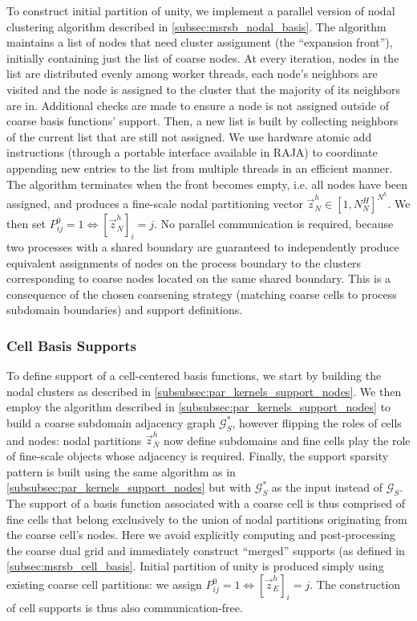 To construct initial partition of unity, we implement a parallel version of nodal clustering algorithm described in \cref{subsec:msrsb_nodal_basis}.   The algorithm maintains a list of nodes that need cluster assignment (the ``expansion front''), initially containing just the list of coarse nodes.   At every iteration, nodes in the list are distributed evenly among worker threads, each node's neighbors are visited and the node is assigned to the cluster that the majority of its neighbors are in.   Additional checks are made to ensure a node is not assigned outside of coarse basis functions' support.   Then, a new list is built by collecting neighbors of the current list that are still not assigned.   We use hardware atomic add instructions (through a portable interface available in RAJA) to coordinate appending new entries to the list from multiple threads in an efficient manner.   The algorithm terminates when the front becomes empty, i.e. all nodes have been assigned, and produces a fine-scale nodal partitioning vector $\vec{z}_N^h \in [1,N_N^H]^{N^h}$.    We then set $P_{ij}^0 = 1 \Leftrightarrow [\vec{z}_N^h]_i = j$.   No parallel communication is required, because two processes with a shared boundary are guaranteed to independently produce equivalent assignments of nodes on the process boundary to the clusters corresponding to coarse nodes located on the same shared boundary.   This is a consequence of the chosen coarsening strategy (matching coarse cells to process subdomain boundaries) and support definitions.

\subsubsection{Cell Basis Supports}
\label{subsubsec:par_kernels_support_cells}

To define support of a cell-centered basis functions, we start by building the nodal clusters as described in \cref{subsubsec:par_kernels_support_nodes}.   We then employ the algorithm described in \cref{subsubsec:par_kernels_support_nodes} to build a coarse subdomain adjacency graph $\mathcal{G}_S^*$, however flipping the roles of cells and nodes: nodal partitions $\vec{z}_N^h$ now define subdomains and fine cells play the role of fine-scale objects whose adjacency is required.   Finally, the support sparsity pattern is built using the same algorithm as in \cref{subsubsec:par_kernels_support_nodes} but with $\mathcal{G}_S^*$ as the input instead of $\mathcal{G}_S$.   The support of a basis function associated with a coarse cell is thus comprised of fine cells that belong exclusively to the union of nodal partitions originating from the coarse cell's nodes.   Here we avoid explicitly computing and post-processing the coarse dual grid and immediately construct ``merged'' supports (as defined in \cref{subsec:msrsb_cell_basis}.   Initial partition of unity is produced simply using existing coarse cell partitions: we assign $P_{ij}^0 = 1 \Leftrightarrow [\vec{z}_E^h]_i = j$.   The construction of cell supports is thus also communication-free.

